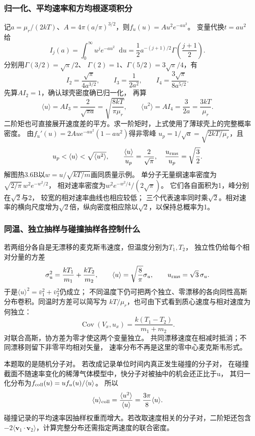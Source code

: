 \documentclass[UTF8,fontset=fandol,a4paper,11pt]{ctexart}
\newcommand{\dd}{\mathop{}\!\mathrm{d}}
\begin{document}
\subsubsection*{归一化、平均速率和方均根逐项积分}
记$a=\mu_r/(2kT)$、$A=4\pi(a/\pi)^{3/2}$，则$f_u(u)=Au^2e^{-au^2}$。
变量代换$t=au^2$给
\[
I_j(a)=\int_0^\infty u^je^{-au^2}\dd u
=\frac12a^{-(j+1)/2}
\Gamma\left(\frac{j+1}{2}\right).
\]
分别用$\Gamma(3/2)=\sqrt\pi/2$、
$\Gamma(2)=1$、$\Gamma(5/2)=3\sqrt\pi/4$，有
\[
I_2=\frac{\sqrt\pi}{4a^{3/2}},\qquad
I_3=\frac1{2a^2},\qquad
I_4=\frac{3\sqrt\pi}{8a^{5/2}}.
\]
先算$AI_2=1$，确认球壳密度确已归一化，
再算
\[
\langle u\rangle=AI_3=\frac{2}{\sqrt{\pi a}}
=\sqrt{\frac{8kT}{\pi\mu_r}},\qquad
\langle u^2\rangle=AI_4=\frac3{2a}=\frac{3kT}{\mu_r}.
\]
二阶矩也可直接展开速度差的平方。求一阶矩时，上式使用了薄球壳上的完整概率密度。
由$f_u'(u)=2Au e^{-au^2}(1-au^2)$得非零峰
$u_p=1/\sqrt a=\sqrt{2kT/\mu_r}$，且
\[
u_p<\langle u\rangle<\sqrt{\langle u^2\rangle},\qquad
\frac{\langle u\rangle}{u_p}=\frac2{\sqrt\pi},\quad
\frac{u_{\rm rms}}{u_p}=\sqrt{\frac32}.
\]
解图热3.6B以$w=u/\sqrt{kT/m}$画同质量示例。
单分子无量纲速率密度为$\sqrt{2/\pi}\,w^2e^{-w^2/2}$，
相对速率密度为$w^2e^{-w^2/4}/(2\sqrt\pi)$。
它们各自面积为1，峰分别在$\sqrt2$与2，
较宽的相对速率曲线也相应较低；
三个代表速率同时乘$\sqrt2$。相对速率的横向尺度增为$\sqrt2$倍，纵向密度相应除以$\sqrt2$，以保持总概率为1。

\subsubsection*{同温、独立抽样与碰撞抽样各控制什么}
若两组分各自是无漂移的麦克斯韦速度，但温度分别为$T_1,T_2$，
独立性仍给每个相对分量的方差
\[
\sigma_u^2=\frac{kT_1}{m_1}+\frac{kT_2}{m_2},\qquad
\langle u\rangle=\sqrt{\frac8\pi}\sigma_u,\qquad
u_{\rm rms}=\sqrt3\,\sigma_u.
\]
于是$\langle u\rangle^2=\bar v_1^2+\bar v_2^2$仍成立；
不同温度下仍可把两个独立、零漂移的各向同性高斯分布卷积。同温时方差可以简写为 $kT/\mu_r$，也可由下式看到质心速度与相对速度为何独立：
\[
\operatorname{Cov}(V_x,u_x)
=\frac{k(T_1-T_2)}{m_1+m_2}.
\]
对联合高斯，协方差为零才使这两个变量独立。
共同漂移速度在相减时抵消；不同漂移则留下非零平均相对矢量，
速率分布不再是这里的零中心麦克斯韦形式。

本题取的是随机分子对。
若改成记录单位时间内真正发生碰撞的分子对，
在碰撞截面不随速率变化的稀薄气体模型中，快分子对被抽中的机会还正比于u，
其归一化分布为$f_{\rm coll}(u)=uf_u(u)/\langle u\rangle$。
所以
\[
\langle u\rangle_{\rm coll}
=\frac{\langle u^2\rangle}{\langle u\rangle}
=\frac{3\pi}{8}\langle u\rangle.
\]
碰撞记录的平均速率因抽样权重而增大。若改取速度相关的分子对，二阶矩还包含 $-2\langle\bm v_1\cdot\bm v_2\rangle$，计算完整分布还需指定两速度的联合密度。
\end{document}
